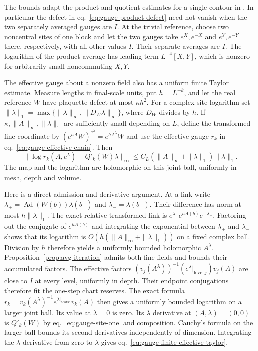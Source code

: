 \documentclass[11pt,letterpaper,reqno]{amsart}
\numberwithin{equation}{section}
\renewcommand{\eqref}[1]{\textup{eq.~\ref{#1}}}
\theoremstyle{definition}
\theoremstyle{remark}
\begin{document}
The bounds adapt the product and quotient estimates for a single
contour in \cite[\S F, Props.~8--10]{Bal85a}. In particular the
defect in \eqref{eq:gauge-product-defect} need not vanish when the
two separately averaged gauges are \(I\). At the trivial
reference, choose two noncentral sites of one block and let the
two gauges take \(e^X,e^{-X}\) and \(e^Y,e^{-Y}\) there,
respectively, with all other values \(I\). Their separate
averages are \(I\). The logarithm of the product average has
leading term \(L^{-4}[X,Y]\), which is nonzero for arbitrarily
small noncommuting \(X,Y\).

The effective gauge about a nonzero field also has a uniform
finite Taylor estimate. Measure lengths in final-scale units,
put $h=L^{-k}$, and let the real reference $W$ have plaquette
defect at most $\kappa h^2$. For a complex site logarithm set
$\|\lambda\|_1=\max\{\|\lambda\|_\infty,
\|D_W\lambda\|_\infty\}$, where $D_W$ divides by $h$.
If $\kappa,\|A\|_\infty,\|\lambda\|_1$ are sufficiently small
depending on $L$, define the transformed fine coordinate by
$(e^{hA}W)^{e^\lambda}=e^{hA^\lambda}W$ and use the effective
gauge $r_k$ in \eqref{eq:gauge-effective-chain}. Then
\begin{equation}\label{eq:gauge-finite-effective-taylor}
 \|\log r_k(A,e^\lambda)-Q'_k(W)\lambda\|_\infty
       \le C_L(\|A\|_\infty+\|\lambda\|_1)\|\lambda\|_1 .
\end{equation}
The map and the logarithm are holomorphic on this joint ball,
uniformly in mesh, depth and volume.

Here is a direct admission and derivative argument. At a link write
$\lambda_+=\operatorname{Ad}(W(b))\lambda(b_+)$ and
$\lambda_- =\lambda(b_-)$. Their difference has norm at most
$h\|\lambda\|_1$. The exact relative transformed link is
$e^{\lambda_-}e^{hA(b)}e^{-\lambda_+}$.
Factoring out the conjugate of $e^{hA(b)}$ and integrating the
exponential between $\lambda_+$ and $\lambda_-$ shows that its
logarithm is $O(h(\|A\|_\infty+\|\lambda\|_1))$ on a fixed
complex ball. Division by $h$ therefore yields a uniformly bounded
holomorphic $A^\lambda$. Proposition~\ref{prop:avg-iteration}
admits both fine fields and bounds their accumulated factors.
The effective factors
\((v_j(A^\lambda))^{-1}(e^\lambda|_{\mathrm{level}\ j})v_j(A)\)
are close to \(I\) at every level, uniformly in depth. Their
endpoint conjugations therefore fit the one-step chart reserves.
The exact formula
$r_k=v_k(A^\lambda)^{-1}e^{\lambda|_{\mathrm{coarse}}}v_k(A)$
then gives a uniformly bounded logarithm on a larger joint ball.
Its value at $\lambda=0$ is zero. Its $\lambda$ derivative at
$(A,\lambda)=(0,0)$ is $Q'_k(W)$ by
\eqref{eq:gauge-site-one} and composition. Cauchy's formula on
the larger ball bounds its second derivatives independently of
dimension. Integrating the $\lambda$ derivative from zero to
$\lambda$ gives \eqref{eq:gauge-finite-effective-taylor}.
\end{document}
